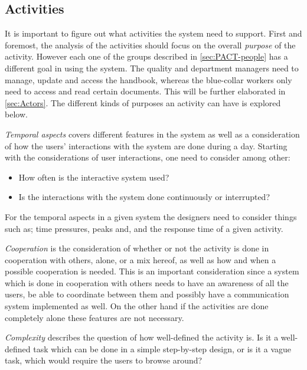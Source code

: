 \subsection{Activities}\label{sec:PACT-actvities}

It is important to figure out what activities the system need to support.
First and foremost, the analysis of the activities should focus on the overall \textit{purpose} of the activity.
However each one of the groups described in \cref{sec:PACT-people} has a different goal in using the system.
The quality and department managers need to manage, update and access the handbook, whereas the blue-collar workers only need to access and read certain documents.
This will be further elaborated in \cref{sec:Actors}.
The different kinds of purposes an activity can have is explored below.

\textit{Temporal aspects} covers different features in the system as well as a consideration of how the users' interactions with the system are done during a day.
Starting with the considerations of user interactions, one need to consider among other:

\begin{itemize}
	\item How often is the interactive system used?
	\item Is the interactions with the system done continuously or interrupted?
\end{itemize}

For the temporal aspects in a given system the designers need to consider things such as; time pressures, peaks and, and the response time of a given activity.

\textit{Cooperation} is the consideration of whether or not the activity is done in cooperation with others, alone, or a mix hereof, as well as how and when a possible cooperation is needed.
This is an important consideration since a system which is done in cooperation with others needs to have an awareness of all the users, be able to coordinate between them and possibly have a communication system implemented as well.
On the other hand if the activities are done completely alone these features are not necessary.

\textit{Complexity} describes the question of how well-defined the activity is.
Is it a well-defined task which can be done in a simple step-by-step design, or is it a vague task, which would require the users to browse around?

